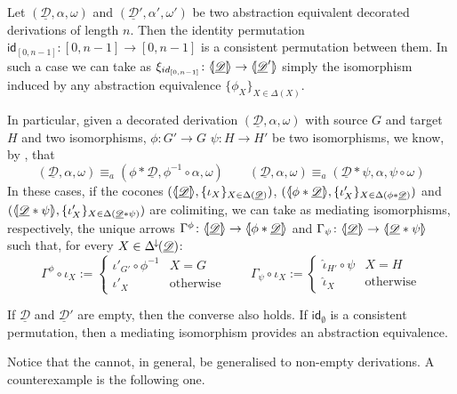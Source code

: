 \documentclass[a4paper,UKenglish,cleveref,pdftex,thm-restate,numberwithinsect]{lipics-v2021}
\newcommand{\Deltamin}{\Delta^{\hspace{-1pt}\downarrow\hspace{-1pt}}}
\newcommand{\id}[1]{\mathsf{id}_{#1}}
\newcommand{\dder}[1]{\mathscr{#1}}
\newcommand{\der}[1]{\underline{\dder{#1}}}
\newcommand{\lpro}{\langle \hspace{-1.85pt}[}
\newcommand{\rpro}{]\hspace{-1.85pt}\rangle}
\newcommand{\tpro}[1]{\lpro \der{#1}\rpro}
\begin{document}
\begin{remark} \label{rem:abscons}Let $(\der{D}, \alpha, \omega)$ and $(\der{D}', \alpha', \omega')$ be two abstraction equivalent decorated derivations of length $n$. Then the identity permutation $\id{[0,n-1]}\colon [0,n-1]\to [0,n-1]$ is a consistent permutation between them. In such a case we can take as $\xi_{\id{[0,n-1]}}\colon \tpro{D}\to \lpro \der{D}'\rpro$ simply the isomorphism induced by any abstraction equivalence $\{\phi_X\}_{X\in \Delta(X)}$.

  In particular, given a decorated derivation $(\der{D}, \alpha, \omega)$ with source $G$ and target $H$ and two isomorphisms, $\phi\colon G'\to G$ $\psi\colon H\to H'$ be two isomorphisms, we know, by , that \[(\der{D}, \alpha, \omega)\equiv_a (\phi*\der{D}, \phi^{-1}\circ \alpha, \omega ) \qquad (\der{D}, \alpha, \omega)\equiv_a (\der{D}*\psi, \alpha, \psi \circ \omega )\]
  In these cases, if the cocones $(\tpro{D}, \{\iota_X\}_{X\in \Delta(\der{D})})$, $(\lpro \phi *\der{D} \rpro, \{\iota'_X\}_{X\in \Delta(\phi *\der{D})})$ and $(\lpro \der{D}*\psi \rpro, \{\iota'_X\}_{X\in \Delta(\der{D}*\psi)})$ are colimiting, we can take as mediating isomorphisms, respectively, the unique arrows $\Gamma^{\phi} \colon \tpro{D}\to \lpro \phi*\der{D} \rpro$ and $\Gamma_\psi\colon \tpro{D}\to \lpro \der{D}*\psi \rpro$  such that, for every $X\in \Deltamin(\der{D})$:
  \[\Gamma^\phi \circ \iota_X:=\begin{cases}
      \iota'_{G'}\circ \phi^{-1} & X=G              \\
      \iota'_X                   & \text{otherwise}
    \end{cases} \qquad \Gamma_\psi \circ \iota_X:=\begin{cases}
      \hat{\iota}_{H'}\circ \psi & X=H              \\
      \hat{\iota}_X              & \text{otherwise}
    \end{cases}\]
\end{remark}


\begin{remark}\label{ex:empty}
  If $\der{D}$ and $\der{D}'$ are empty, then the converse also holds. If $\id{\emptyset}$ is a consistent permutation, then a mediating isomorphism provides an abstraction equivalence.
\end{remark}

\begin{example}Notice that the  cannot, in general, be generalised to non-empty derivations. A counterexample is the following one.
\end{example}
\end{document}
